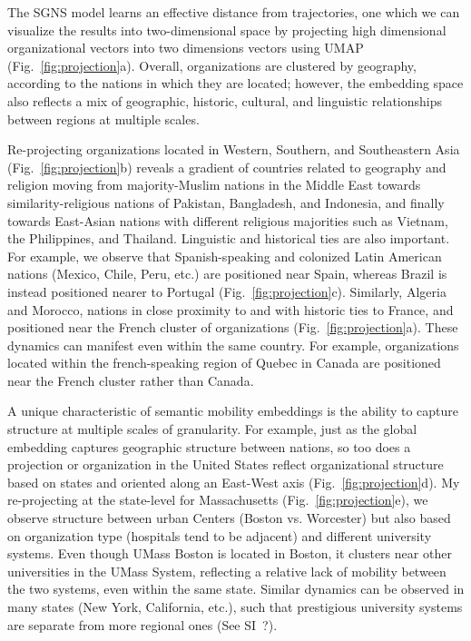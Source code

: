 \documentclass[12pt]{article} %
\begin{document}
The SGNS model learns an effective distance from trajectories, one which we can visualize the results into two-dimensional space by projecting high dimensional organizational vectors into two dimensions vectors using UMAP \cite{mcinnes2018umap} (Fig.~\ref{fig:projection}a).
Overall, organizations are clustered by geography, according to the nations in which they are located;
however, the embedding space also reflects a mix of geographic, historic, cultural, and linguistic relationships between regions at multiple scales.

Re-projecting organizations located in Western, Southern, and Southeastern Asia (Fig.~\ref{fig:projection}b) reveals a gradient of countries related to geography and religion moving from majority-Muslim nations in the Middle East towards similarity-religious nations of Pakistan, Bangladesh, and Indonesia, and finally towards East-Asian nations with different religious majorities such as Vietnam, the Philippines, and Thailand. 
Linguistic and historical ties are also important. 
For example, we observe that Spanish-speaking and colonized Latin American nations (Mexico, Chile, Peru, etc.) are positioned near Spain, whereas Brazil is instead positioned nearer to Portugal (Fig.~\ref{fig:projection}c). 
Similarly, Algeria and Morocco, nations in close proximity to and with historic ties to France, and positioned near the French cluster of organizations (Fig.~\ref{fig:projection}a). 
These dynamics can manifest even within the same country. 
For example, organizations located within the french-speaking region of Quebec in Canada are positioned near the French cluster rather than Canada.

A unique characteristic of semantic mobility embeddings is the ability to capture structure at multiple scales of granularity.
For example, just as the global embedding captures geographic structure between nations, so too does a projection or organization in the United States reflect organizational structure based on states and oriented along an East-West axis (Fig.~\ref{fig:projection}d). 
My re-projecting at the state-level for Massachusetts (Fig.~\ref{fig:projection}e), we observe structure between urban Centers (Boston vs. Worcester) but also based on organization type (hospitals tend to be adjacent) and different university systems. Even though UMass Boston is located in Boston, it clusters near other universities in the UMass System, reflecting a relative lack of mobility between the two systems, even within the same state. 
Similar dynamics can be observed in many states (New York, California, etc.), such that prestigious university systems are separate from more regional ones (See SI~?).
\end{document}
